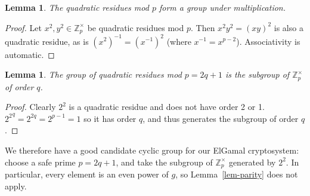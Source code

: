 \documentclass[11pt,twoside,a4paper]{article}
\newtheorem{lemma}[theorem]{Lemma}
\theoremstyle{definition}
\begin{document}
\begin{lemma}
    The quadratic residues mod $p$ form a group under multiplication.
\end{lemma}
\begin{proof}
    Let $x^2,y^2\in\mathbb{Z}^\times_p$ be quadratic residues mod $p$. Then $x^2y^2=(xy)^2$ is also a quadratic residue, as is $(x^2)^{-1}=(x^{-1})^2$ (where $x^{-1}=x^{p-2}$). Associativity is automatic.
\end{proof}
\begin{lemma}
    The group of quadratic residues mod $p=2q+1$ is the subgroup of $\mathbb{Z}^\times_p$ of order $q$.
\end{lemma}
\begin{proof}
    Clearly $2^2$ is a quadratic residue and does not have order 2 or 1. ${2^2}^q=2^{2q}=2^{p-1}=1$ so it has order $q$, and thus generates the subgroup of order $q$.
\end{proof}
We therefore have a good candidate cyclic group for our ElGamal cryptosystem: choose a safe prime $p=2q+1$, and take the subgroup of $\mathbb{Z}^\times_p$ generated by $2^2$. In particular, every element is an even power of $g$, so Lemma~\ref{lem-parity} does not apply.
\end{document}
